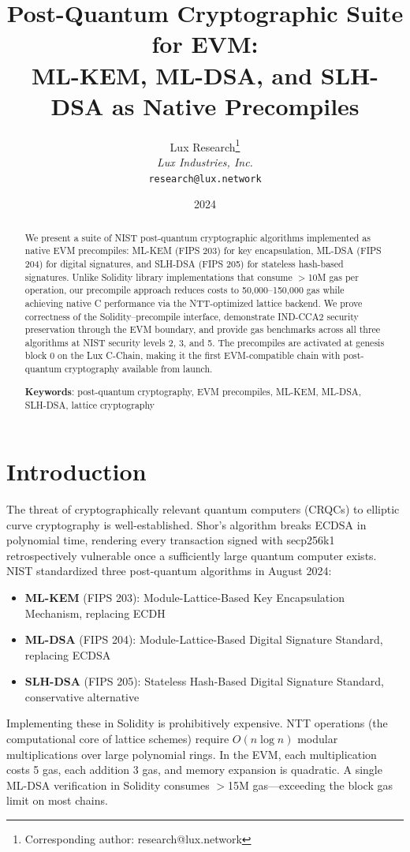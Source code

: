 \documentclass[11pt,letterpaper]{article}
\title{Post-Quantum Cryptographic Suite for EVM:\\ML-KEM, ML-DSA, and SLH-DSA as Native Precompiles}
\author{
Lux Research\thanks{Corresponding author: research@lux.network}\\
\textit{Lux Industries, Inc.}\\
\texttt{research@lux.network}
}
\date{2024}
\begin{document}
\luxcoverpage

\begin{abstract}
We present a suite of NIST post-quantum cryptographic algorithms implemented as native EVM precompiles: ML-KEM (FIPS 203) for key encapsulation, ML-DSA (FIPS 204) for digital signatures, and SLH-DSA (FIPS 205) for stateless hash-based signatures. Unlike Solidity library implementations that consume $>$10M gas per operation, our precompile approach reduces costs to 50,000--150,000 gas while achieving native C performance via the NTT-optimized lattice backend. We prove correctness of the Solidity--precompile interface, demonstrate IND-CCA2 security preservation through the EVM boundary, and provide gas benchmarks across all three algorithms at NIST security levels 2, 3, and 5. The precompiles are activated at genesis block 0 on the Lux C-Chain, making it the first EVM-compatible chain with post-quantum cryptography available from launch.

\textbf{Keywords}: post-quantum cryptography, EVM precompiles, ML-KEM, ML-DSA, SLH-DSA, lattice cryptography
\end{abstract}

\section{Introduction}

The threat of cryptographically relevant quantum computers (CRQCs) to elliptic curve cryptography is well-established. Shor's algorithm breaks ECDSA in polynomial time, rendering every transaction signed with secp256k1 retrospectively vulnerable once a sufficiently large quantum computer exists. NIST standardized three post-quantum algorithms in August 2024:

\begin{itemize}
    \item \textbf{ML-KEM} (FIPS 203): Module-Lattice-Based Key Encapsulation Mechanism, replacing ECDH
    \item \textbf{ML-DSA} (FIPS 204): Module-Lattice-Based Digital Signature Standard, replacing ECDSA
    \item \textbf{SLH-DSA} (FIPS 205): Stateless Hash-Based Digital Signature Standard, conservative alternative
\end{itemize}

Implementing these in Solidity is prohibitively expensive. NTT operations (the computational core of lattice schemes) require $O(n \log n)$ modular multiplications over large polynomial rings. In the EVM, each multiplication costs 5 gas, each addition 3 gas, and memory expansion is quadratic. A single ML-DSA verification in Solidity consumes $>$15M gas---exceeding the block gas limit on most chains.
\end{document}

